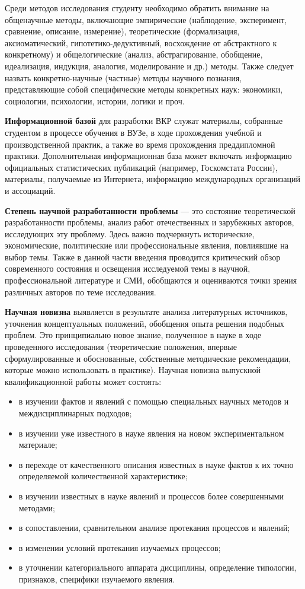 Среди методов исследования студенту необходимо обратить внимание на общенаучные методы, включающие эмпирические (наблюдение, эксперимент, сравнение, описание, измерение), теоретические (формализация, аксиоматический, гипотетико-дедуктивный, восхождение от абстрактного к конкретному) и общелогические (анализ, абстрагирование, обобщение, идеализация, индукция, аналогия, моделирование и др.) методы.
Также следует назвать конкретно-научные (частные) методы научного познания, представляющие собой специфические методы конкретных наук: экономики, социологии, психологии, истории, логики и проч.

\textbf{Информационной базой} для разработки ВКР служат материалы, собранные студентом в процессе обучения в ВУЗе, в ходе прохождения учебной и производственной практик, а также во время прохождения преддипломной практики.
Дополнительная информационная база может включать информацию официальных статистических публикаций (например, Госкомстата России), материалы, получаемые из Интернета, информацию международных организаций и ассоциаций. 

\textbf{Степень научной разработанности проблемы} --- это состояние теоретической разработанности проблемы, анализ работ отечественных и зарубежных авторов, исследующих эту проблему. Здесь важно подчеркнуть исторические, экономические, политические или профессиональные явления, повлиявшие на выбор темы. Также в данной части введения проводится критический обзор современного состояния и освещения исследуемой темы в научной, профессиональной литературе и СМИ, обобщаются и оцениваются точки зрения различных авторов по теме исследования. 

\textbf{Научная новизна} выявляется в результате анализа литературных источников, уточнения концептуальных положений, обобщения опыта решения подобных проблем. Это принципиально новое знание, полученное в науке в ходе проведенного исследования (теоретические положения, впервые сформулированные и обоснованные, собственные методические рекомендации, которые можно использовать в практике).
Научная новизна выпускной квалификационной работы может состоять: 
\begin{itemize}
	\item в изучении фактов и явлений с помощью специальных научных методов и междисциплинарных подходов;
    \item в изучении уже известного в науке явления на новом экспериментальном материале;
	\item в переходе от качественного описания известных в науке фактов к их точно определяемой количественной характеристике;
	\item в изучении известных в науке явлений и процессов более совершенными методами;
	\item в сопоставлении, сравнительном анализе протекания процессов и явлений;
	\item в изменении условий протекания изучаемых процессов;
	\item в уточнении категориального аппарата дисциплины, определение типологии, признаков, специфики изучаемого явления.
\end{itemize}

